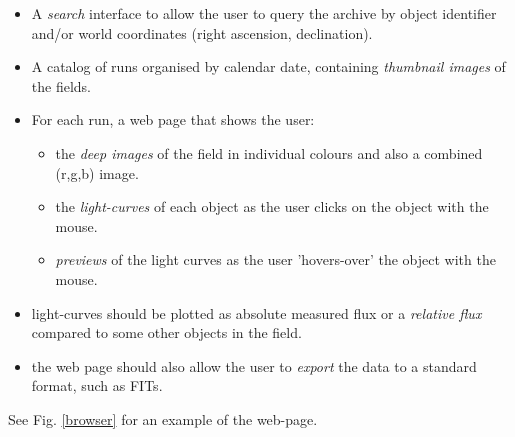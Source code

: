 \documentclass[a4paper,10pt]{article}
\begin{document}
\begin{itemize}
	\item A \emph{search} interface to allow the user to query the archive by object identifier and/or world coordinates (right ascension, declination). 
	\item A catalog of runs organised by calendar date, containing \emph{thumbnail images} of the fields.
	\item For each run, a web page that shows the user:
	\begin{itemize}
		\item the \emph{deep images} of the field in individual colours and also a combined (r,g,b) image.
		\item the \emph{light-curves} of each object as the user clicks on the object with the mouse. 
		\item \emph{previews} of the light curves as the user 'hovers-over' the object with the mouse. 
	\end{itemize}
	\item light-curves should be plotted as absolute measured flux or a \emph{relative flux} compared to some other objects in the field. 
	\item the web page should also allow the user to \emph{export} the data to a standard format, such as FITs.
	
\end{itemize}
See Fig. \ref{browser} for an example of the web-page. 
\end{document}
